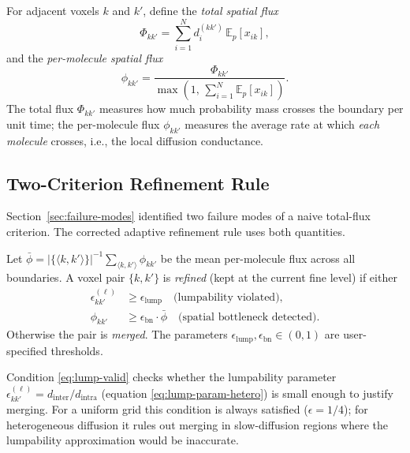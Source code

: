 \documentclass[review,onefignum,onetabnum]{siamart171218}
\newcommand{\E}{\mathbb{E}}
\begin{document}
\begin{definition}
  \label{def:flux-quantities}
  For adjacent voxels $k$ and $k'$, define the
  \emph{total spatial flux}
  \begin{equation}
    \label{eq:spatial-flux}
    \Phi_{kk'} = \sum_{i=1}^{N} d_i^{(kk')}\, \E_p[x_{ik}],
  \end{equation}
  and the \emph{per-molecule spatial flux}
  \begin{equation}
    \label{eq:specific-flux}
    \phi_{kk'} = \frac{\Phi_{kk'}}{\max\!\left(1,\,
      \sum_{i=1}^N \E_p[x_{ik}]\right)}.
  \end{equation}
  The total flux $\Phi_{kk'}$ measures how much probability
  mass crosses the boundary per unit time; the per-molecule
  flux $\phi_{kk'}$ measures the average rate at which
  \emph{each molecule} crosses, i.e., the local diffusion
  conductance.
\end{definition}

\subsection{Two-Criterion Refinement Rule}
\label{sec:two-criterion}

Section~\ref{sec:failure-modes} identified two failure modes of
a naive total-flux criterion.  The corrected adaptive refinement
rule uses both quantities.

\begin{definition}
  \label{def:two-criterion}
  Let $\bar{\phi} = |\{\langle k,k'\rangle\}|^{-1}
  \sum_{\langle k,k'\rangle} \phi_{kk'}$ be the mean
  per-molecule flux across all boundaries.  A voxel pair
  $\{k,k'\}$ is \emph{refined} (kept at the current fine
  level) if either
  \begin{align}
    \label{eq:lump-valid}
    \epsilon_{kk'}^{(\ell)} &\geq \epsilon_{\mathrm{lump}}
    \quad \text{(lumpability violated),} \\
    \label{eq:bottleneck}
    \phi_{kk'} &\geq \epsilon_{\mathrm{bn}} \cdot \bar{\phi}
    \quad \text{(spatial bottleneck detected).}
  \end{align}
  Otherwise the pair is \emph{merged}.  The parameters
  $\epsilon_{\mathrm{lump}}, \epsilon_{\mathrm{bn}} \in (0,1)$
  are user-specified thresholds.
\end{definition}

Condition \eqref{eq:lump-valid} checks whether the lumpability
parameter $\epsilon_{kk'}^{(\ell)} = d_{\mathrm{inter}} /
d_{\mathrm{intra}}$ (equation \eqref{eq:lump-param-hetero})
is small enough to justify merging.  For a uniform grid this
condition is always satisfied ($\epsilon = 1/4$); for
heterogeneous diffusion it rules out merging in slow-diffusion
regions where the lumpability approximation would be inaccurate.
\end{document}

